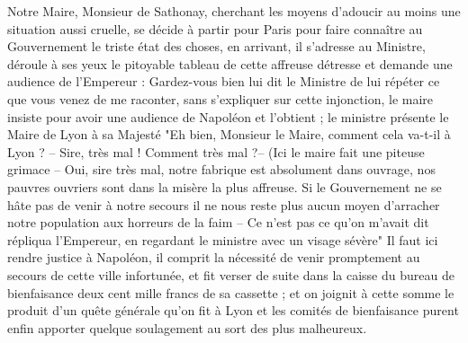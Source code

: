 \documentclass[11pt,a4paper]{report}
\begin{document}
Notre Maire, Monsieur de Sathonay, cherchant les moyens d'adoucir au moins une situation aussi cruelle, se décide à partir pour Paris pour faire connaître au Gouvernement le triste état des choses, en arrivant, il s'adresse au Ministre, déroule à ses yeux le pitoyable tableau de cette affreuse détresse et demande une audience de l'Empereur : Gardez-vous bien lui dit le Ministre de lui répéter ce que vous venez de me raconter, sans s'expliquer sur cette injonction, le maire insiste pour avoir une audience de Napoléon et l'obtient ; le ministre présente le Maire de Lyon à sa Majesté "Eh bien, Monsieur le Maire, comment cela va-t-il à Lyon ? -- Sire, très mal ! Comment très mal ?-- (Ici le maire fait une piteuse grimace -- Oui, sire très mal, notre fabrique est absolument dans ouvrage, nos pauvres ouvriers sont dans la misère la plus affreuse. Si le Gouvernement ne se hâte pas de venir à notre secours il ne nous reste plus aucun moyen d'arracher notre population aux horreurs de la faim -- Ce n'est pas ce qu'on m'avait dit répliqua l'Empereur, en regardant le ministre avec un visage sévère" Il faut ici rendre justice à Napoléon, il comprit la nécessité de venir promptement au secours de cette ville infortunée, et fit verser de suite dans la caisse du bureau de bienfaisance deux cent mille francs de sa cassette ; et on joignit à cette somme le produit d'un quête générale qu'on fit à Lyon et les comités de bienfaisance purent enfin apporter quelque soulagement au sort des plus malheureux.
\end{document}

